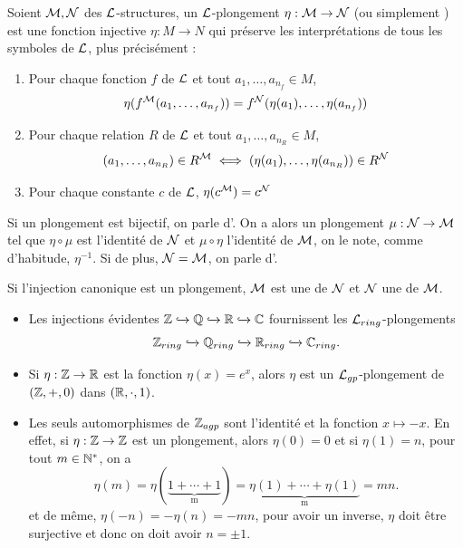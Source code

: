 \begin{defi}\label{plongement}
    Soient $\mathcal{M}, \mathcal{N}$ des $\mathcal{L}$-structures, un $\mathcal{L}$-plongement $\eta : \mathcal{M} \rightarrow \mathcal{N}$ (ou simplement )
    est une fonction injective $\eta : M \rightarrow N$ qui préserve les
    interprétations de tous les symboles de $\mathcal{L}$, plus précisément :
    \begin{enumerate}[label= (\roman*)]
        \item Pour chaque fonction $f$ de $\mathcal{L}$ et tout $a_1, \ldots, a_{n_f} \in
        M$, \[\eta(f^{\mathcal{M}}(a_1,\ldots,a_{n_f})) =
        f^{\mathcal{N}}(\eta(a_1),\ldots,\eta(a_{n_f})) \]
        \item Pour chaque relation $R$ de $\mathcal{L}$ et tout $a_1, \ldots, a_{n_R}
        \in M$, \[(a_1, \ldots, a_{n_R}) \in R^{\mathcal{M}} \iff (\eta(a_1), \ldots,
        \eta(a_{n_R})) \in R^{\mathcal{N}} \]
        \item Pour chaque constante $c$ de $\mathcal{L}$, $ \eta(c^{\mathcal{M}}) = c^{\mathcal{N}}$
    \end{enumerate} 

    Si un plongement est bijectif, on parle d'. On a alors un
    plongement $\mu : \mathcal{N} \rightarrow \mathcal{M}$ tel que $\eta \circ \mu$ est
    l'identité de $\mathcal{N}$ et $\mu \circ \eta$
    l'identité de $\mathcal{M}$, on le note, comme d'habitude, $\eta^{-1}$.
    Si de plus, $\mathcal{N} = \mathcal{M}$, on parle d'.

    Si l'injection canonique est un plongement, $\mathcal{M}$ est une  de $\mathcal{N}$ et $\mathcal{N}$ une  de $\mathcal{M}$.
\end{defi}

\begin{exem}
    \begin{itemize}
        \item Les injections évidentes $\mathbb{Z} \xhookrightarrow{} \mathbb{Q} \xhookrightarrow{} \mathbb{R} \xhookrightarrow{} \mathbb{C}$ fournissent les
$\mathcal{L}_{ring}$-plongements \[ \mathbb{Z}_{ring} \xhookrightarrow{} \mathbb{Q}_{ring} \xhookrightarrow{} \mathbb{R}_{ring}
\xhookrightarrow{} \mathbb{C}_{ring} .\] 
        \item Si $\eta : \mathbb{Z} \rightarrow \mathbb{R}$ est la fonction $\eta(x) = e^x$, alors $\eta$
est un $\mathcal{L}_{gp}$-plongement de $(\mathbb{Z},+,0)$ dans $(\mathbb{R},\cdot,1)$.
        \item Les seuls automorphismes de $\mathbb{Z}_{agp}$ sont l'identité et la
        fonction $x \mapsto -x$. En effet, si $\eta : \mathbb{Z} \rightarrow \mathbb{Z}$ est
        un plongement, alors $\eta(0) = 0$ et si $\eta(1) = n$, pour tout $m \in
        \mathbb{N}^{*}$, on a \[ \eta(m)=\eta(\underbrace{1+\cdots+1}_\text{m}) =
        \underbrace{\eta(1)+\cdots+\eta(1)}_\text{m} = mn .\] et de même,
        $\eta(-n)=-\eta(n)=-mn$, pour avoir un inverse, $\eta$ doit être
        surjective et donc on doit avoir $n = \pm 1$.
    \end{itemize}

\end{exem}


